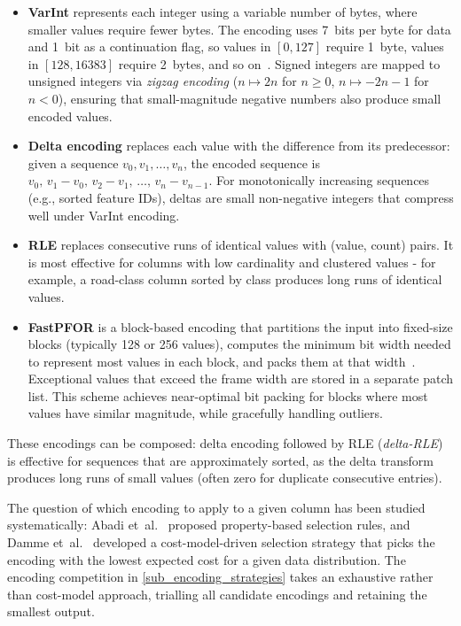 \begin{itemize}
    \item \textbf{\acf{VarInt}} represents each integer using a variable number of bytes, where smaller values require fewer bytes.
    The encoding uses 7~bits per byte for data and 1~bit as a continuation flag, so values in $[0, 127]$ require 1~byte, values in $[128, 16383]$ require 2~bytes, and so on~\cite{ProtocolBuffers}.
    Signed integers are mapped to unsigned integers via \emph{zigzag encoding} ($n \mapsto 2n$ for $n \geq 0$, $n \mapsto -2n-1$ for $n < 0$), ensuring that small-magnitude negative numbers also produce small encoded values.

    \item \textbf{Delta encoding} replaces each value with the difference from its predecessor: given a sequence $v_0, v_1, \ldots, v_n$, the encoded sequence is $v_0,\, v_1 - v_0,\, v_2 - v_1,\, \ldots,\, v_n - v_{n-1}$.
    For monotonically increasing sequences (e.g., sorted feature IDs), deltas are small non-negative integers that compress well under \ac{VarInt} encoding.

    \item \textbf{\acf{RLE}} replaces consecutive runs of identical values with (value, count) pairs.
    It is most effective for columns with low cardinality and clustered values - for example, a road-class column sorted by class produces long runs of identical values.

    \item \textbf{\acf{FastPFOR}} is a block-based encoding that partitions the input into fixed-size blocks (typically 128 or 256 values), computes the minimum bit width needed to represent most values in each block, and packs them at that width~\cite{lemireDecodingBillionsIntegers2015}.
    Exceptional values that exceed the frame width are stored in a separate patch list.
    This scheme achieves near-optimal bit packing for blocks where most values have similar magnitude, while gracefully handling outliers.
\end{itemize}

These encodings can be composed: delta encoding followed by \ac{RLE} (\emph{delta-\acs{RLE}}) is effective for sequences that are approximately sorted, as the delta transform produces long runs of small values (often zero for duplicate consecutive entries).

The question of which encoding to apply to a given column has been studied systematically: Abadi et~al.~\cite{abadiIntegratingCompressionExecution2006} proposed property-based selection rules, and Damme et~al.~\cite{dammeComprehensiveExperimentalSurvey2019} developed a cost-model-driven selection strategy that picks the encoding with the lowest expected cost for a given data distribution.
The encoding competition in \cref{sub_encoding_strategies} takes an exhaustive rather than cost-model approach, trialling all candidate encodings and retaining the smallest output.

